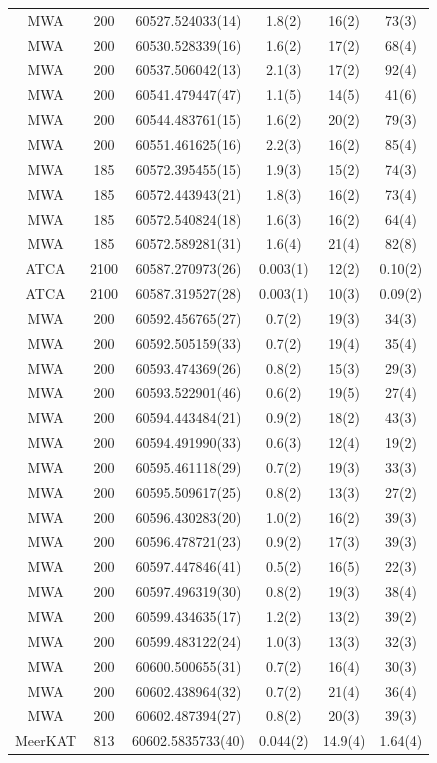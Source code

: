 \documentclass[fleqn,usenatbib]{mnras}
\begin{document}
\begin{table}
\begin{tabular}{cccccc}
MWA & 200 & 60527.524033(14) & 1.8(2) & 16(2) & 73(3) \\
MWA & 200 & 60530.528339(16) & 1.6(2) & 17(2) & 68(4) \\
MWA & 200 & 60537.506042(13) & 2.1(3) & 17(2) & 92(4) \\
MWA & 200 & 60541.479447(47) & 1.1(5) & 14(5) & 41(6) \\
MWA & 200 & 60544.483761(15) & 1.6(2) & 20(2) & 79(3) \\
MWA & 200 & 60551.461625(16) & 2.2(3) & 16(2) & 85(4) \\
MWA & 185 & 60572.395455(15) & 1.9(3) & 15(2) & 74(3) \\
MWA & 185 & 60572.443943(21) & 1.8(3) & 16(2) & 73(4) \\
MWA & 185 & 60572.540824(18) & 1.6(3) & 16(2) & 64(4) \\
MWA & 185 & 60572.589281(31) & 1.6(4) & 21(4) & 82(8) \\
ATCA & 2100 & 60587.270973(26) & 0.003(1) & 12(2) & 0.10(2) \\
ATCA & 2100 & 60587.319527(28) & 0.003(1) & 10(3) & 0.09(2) \\
MWA & 200 & 60592.456765(27) & 0.7(2) & 19(3) & 34(3) \\
MWA & 200 & 60592.505159(33) & 0.7(2) & 19(4) & 35(4) \\
MWA & 200 & 60593.474369(26) & 0.8(2) & 15(3) & 29(3) \\
MWA & 200 & 60593.522901(46) & 0.6(2) & 19(5) & 27(4) \\
MWA & 200 & 60594.443484(21) & 0.9(2) & 18(2) & 43(3) \\
MWA & 200 & 60594.491990(33) & 0.6(3) & 12(4) & 19(2) \\
MWA & 200 & 60595.461118(29) & 0.7(2) & 19(3) & 33(3) \\
MWA & 200 & 60595.509617(25) & 0.8(2) & 13(3) & 27(2) \\
MWA & 200 & 60596.430283(20) & 1.0(2) & 16(2) & 39(3) \\
MWA & 200 & 60596.478721(23) & 0.9(2) & 17(3) & 39(3) \\
MWA & 200 & 60597.447846(41) & 0.5(2) & 16(5) & 22(3) \\
MWA & 200 & 60597.496319(30) & 0.8(2) & 19(3) & 38(4) \\
MWA & 200 & 60599.434635(17) & 1.2(2) & 13(2) & 39(2) \\
MWA & 200 & 60599.483122(24) & 1.0(3) & 13(3) & 32(3) \\
MWA & 200 & 60600.500655(31) & 0.7(2) & 16(4) & 30(3) \\
MWA & 200 & 60602.438964(32) & 0.7(2) & 21(4) & 36(4) \\
MWA & 200 & 60602.487394(27) & 0.8(2) & 20(3) & 39(3) \\
MeerKAT & 813 & 60602.5835733(40) & 0.044(2) & 14.9(4) & 1.64(4) \\
\hline
  \end{tabular}
\end{table}



\bsp	%
\label{lastpage}
\end{document}
